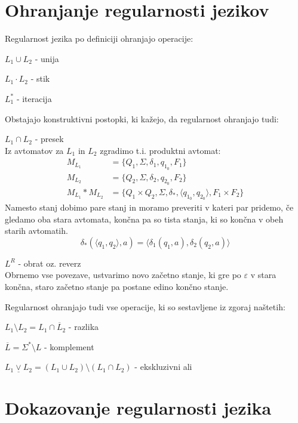\documentclass[10pt,a4paper,oneside]{book}
\begin{document}
\section{Ohranjanje regularnosti jezikov}
Regularnost jezika po definiciji ohranjajo operacije:
\begin{items}
\item $L_1 \cup L_2$ - unija 
\item $L_1 \cdot L_2$ - stik 
\item $L_1^*$ - iteracija
\end{items}
Obstajajo konstruktivni postopki, ki kažejo, da regularnost ohranjajo tudi:
\begin{items}
\item $L_1 \cap L_2$ - presek\\
	Iz avtomatov za $L_1$ in $L_2$ zgradimo t.i. produktni avtomat:
		\begin{align*}
			M_{L_1} &= \{ Q_1, \Sigma, \delta_1, q_{1_0}, F_1 \}\\
			M_{L_2} &= \{ Q_2, \Sigma, \delta_2, q_{2_0}, F_2 \}\\
			M_{L_1}*M_{L_2} &= \{ Q_1 \times Q_2, \Sigma, \delta_*, \langle q_{1_0}, q_{2_0} \rangle, F_1 \times F_2 \}
		\end{align*}
	Namesto stanj dobimo pare stanj in moramo preveriti v kateri par pridemo, če gledamo oba stara avtomata, končna pa so tista stanja, ki so končna v obeh starih avtomatih.
	\begin{displaymath}
		\delta_*(\langle q_1, q_2 \rangle, a) = \langle \delta_1(q_1, a), \delta_2(q_2, a)\rangle
	\end{displaymath}
\item $L^R$ - obrat oz. reverz\\
	Obrnemo vse povezave, ustvarimo novo začetno stanje, ki gre po $\varepsilon$ v stara končna, staro začetno stanje pa postane edino končno stanje.
\end{items}
Regularnost ohranjajo tudi vse operacije, ki so sestavljene iz zgoraj naštetih:
\begin{items}
\item $L_1 \setminus L_2 = L_1 \cap \overline L_2$ - razlika
\item $\overline{L} = \Sigma^* \setminus L$ - komplement
\item $L_1 \underline\vee L_2 = (L_1 \cup L_2) \setminus (L_1 \cap L_2)$ - ekskluzivni ali 
\end{items}

\section{Dokazovanje regularnosti jezika}
\end{document}
